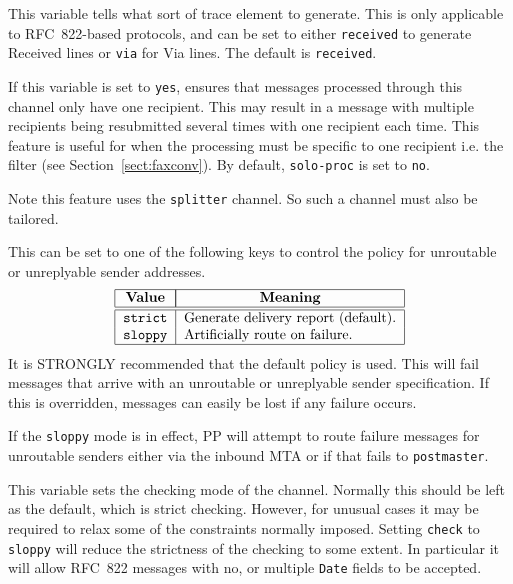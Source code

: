 \begin{describe}
\item[\verb|trace=value|:]
This variable tells  what sort of trace element to
generate. This is only applicable to RFC~822-based protocols, and can
be set to either \verb|received| to generate Received lines or
\verb|via| for Via lines. The default is \verb|received|.

\item[\verb|solo-proc=value|:]
If this variable is set to \verb|yes|,
 ensures that messages processed
through this channel only have one recipient.
This may result in a message with multiple recipients being
resubmitted several times with one recipient each time.
This feature is useful for when the processing must be specific to one
recipient i.e. the  filter (see
Section~\ref{sect:faxconv}).
By default, \verb+solo-proc+ is set to \verb|no|.

Note this feature uses the \verb+splitter+ channel.
So such a channel must also be tailored.

\item[\verb|bad-sender-policy=value|:] 
This can be set to one of the following keys to control the policy for
unroutable or unreplyable sender addresses.
\[\begin{tabular}{| l | l |}
\hline
	\multicolumn{1}{|c|}{\bf Value} &
		\multicolumn{1}{|c|}{\bf Meaning} \\
\hline\hline
	\tt strict&	Generate delivery report (default).\\
	\tt sloppy&	Artificially route on failure. \\
\hline
\end{tabular}\]
It is STRONGLY recommended that the default policy is used. This will
fail messages that arrive with an unroutable or unreplyable sender
specification. If this is overridden, messages can easily be lost if
any failure occurs.

If the \verb+sloppy+ mode is in effect, PP will attempt to route
failure messages for unroutable senders either via the inbound MTA or
if that fails to \verb+postmaster+.

\item[\verb|check=value|:]
This variable sets the checking mode of the channel. Normally this
should be left as the default, which is strict checking. However, for
unusual cases it may be required to relax some of the constraints
normally imposed. Setting \verb|check| to \verb|sloppy| will reduce
the strictness of the checking to some extent. In particular it will
allow RFC~822 messages with no, or multiple \verb|Date| fields to be
accepted.

\end{describe}

